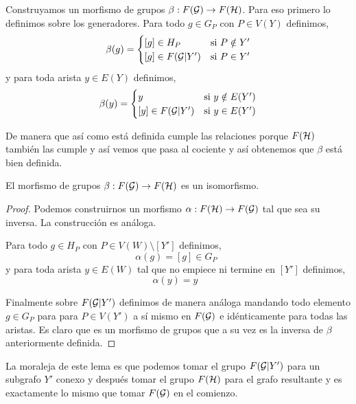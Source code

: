 \documentclass[tesis.tex]{subfiles}
\newcommand{\cG}{ {\cal G} }
\newcommand{\cH}{ {\cal H} }
\begin{document}
Construyamos un morfismo de grupos $\beta:F(\cG) \to F(\cH)$.
Para eso primero lo definimos sobre los generadores.
Para todo $g \in G_P$ con $P \in V(Y)$ definimos,
\begin{equation*}
	\beta(g) = 
	\begin{cases}
		[g] \in H_P & \text{si} \ P \notin Y' \\
		[g] \in F(\cG | Y') & \text{si} \ P \in Y'  \\ 
	\end{cases}
\end{equation*}
y para toda arista $ y \in E(Y)$ definimos,
\begin{equation*}
	\beta(y) = 
	\begin{cases}
		y  & \text{si} \ y \notin E(Y') \\
		[y] \in F(\cG | Y') & \text{si} \ y \in E(Y')  \\ 
	\end{cases}
\end{equation*}

De manera que así como está definida cumple las relaciones porque $F(\cH)$ también las cumple y así vemos que pasa al cociente y así obtenemos que $\beta$ está bien definida.

\begin{lema}
	El morfismo de grupos $\beta:F(\cG) \to F(\cH)$ es un isomorfismo. 
\end{lema}
\begin{proof}
	Podemos construirnos un morfismo $\alpha:F(\cH) \to F(\cG)$ tal que sea su inversa.
	La construcción es análoga.
	
	Para todo $g \in H_P$ con $P \in V(W) \setminus [Y'] $ definimos,
	\begin{equation*}
		\alpha(g) = [g] \in G_P \ \ 
	\end{equation*}
	y para toda arista $ y \in E(W)$ tal que no empiece ni termine en $[Y']$ definimos,
	\begin{equation*}
		\alpha(y) = y  \ \ \ 
	\end{equation*}
	
	Finalmente sobre $F(\cG | Y')$ definimos de manera análoga mandando todo elemento $g \in G_P$ para para $P \in V(Y')$ a sí mismo en $F(\cG)$ e idénticamente para todas las aristas.
	Es claro que es un morfismo de grupos que a su vez es la inversa de $\beta$ anteriormente definida.
\end{proof}

La moraleja de este lema es que podemos tomar el grupo $F(\cG | Y')$ para un subgrafo $Y'$ conexo y después tomar el grupo $F(\cH)$ para el grafo resultante y es exactamente lo mismo que tomar $F(\cG)$ en el comienzo.
\end{document}
